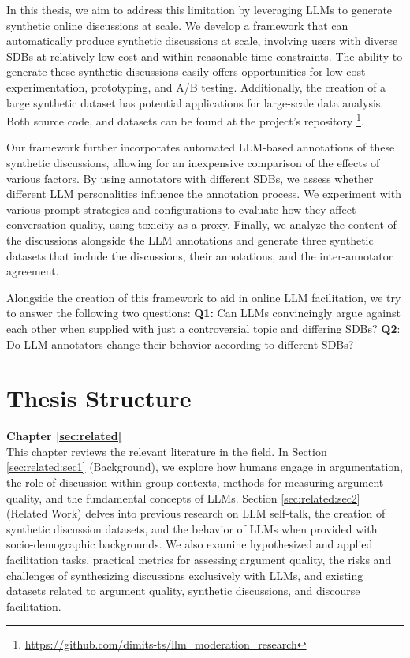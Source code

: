 In this thesis, we aim to address this limitation by leveraging \acp{LLM} to generate synthetic online discussions at scale. We develop a framework that can automatically produce synthetic discussions at scale, involving users with diverse \acp{SDB} at relatively low cost and within reasonable time constraints. The ability to generate these synthetic discussions easily offers opportunities for low-cost experimentation, prototyping, and A/B testing. Additionally, the creation of a large synthetic dataset has potential applications for large-scale data analysis. Both source code, and datasets can be found at the project's repository \footnote{\url{https://github.com/dimits-ts/llm_moderation_research}}.

Our framework further incorporates automated LLM-based annotations of these synthetic discussions, allowing for an inexpensive comparison of the effects of various factors. By using annotators with different SDBs, we assess whether different LLM personalities influence the annotation process. We experiment with various prompt strategies and configurations to evaluate how they affect conversation quality, using toxicity as a proxy. Finally, we analyze the content of the discussions alongside the LLM annotations and generate three synthetic datasets that include the discussions, their annotations, and the inter-annotator agreement.

Alongside the creation of this framework to aid in online LLM facilitation, we try to answer the following two questions: \textbf{Q1:} Can LLMs convincingly argue against each other when supplied with just a controversial topic and differing SDBs? \textbf{Q2}: Do LLM annotators change their behavior according to different SDBs?

\section{Thesis Structure}
\label{sec:intro:structure}

\textbf{Chapter \ref{sec:related}} \\[0.2em]

This chapter reviews the relevant literature in the field. In Section \ref{sec:related:sec1} (Background), we explore how humans engage in argumentation, the role of discussion within group contexts, methods for measuring argument quality, and the fundamental concepts of \acp{LLM}. Section \ref{sec:related:sec2} (Related Work) delves into previous research on LLM self-talk, the creation of synthetic discussion datasets, and the behavior of LLMs when provided with socio-demographic backgrounds. We also examine hypothesized and applied facilitation tasks, practical metrics for assessing argument quality, the risks and challenges of synthesizing discussions exclusively with LLMs, and existing datasets related to argument quality, synthetic discussions, and discourse facilitation.


